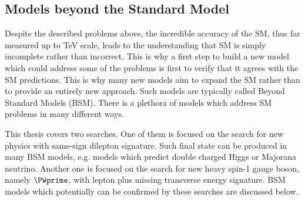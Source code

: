 
\subsection{Models beyond the Standard Model}
\label{subsec:bsm_models}
Despite the described problems above, the incredible accuracy of the SM, thus far measured up to TeV scale, leads to the understanding that SM 
is simply incomplete rather than incorrect. 
This is why a first step to build a new model which could address some of the problems is first to verify that it agrees with the SM predictions. 
This is why many new models aim to expand the SM rather than to provide an entirely new approach. Such models are typically called Beyond Standard Models (BSM).
There is a plethora of models which address SM problems in many different ways. 

This thesis covers two searches. One of them is focused on the search for new physics with same-sign dilepton signature. Such final state can be produced in many BSM models, e.g. models which predict double charged Higgs or Majorana neutrino. Another one is focused on the search for new heavy spin-1 gauge boson, namely $\PWprime$, with lepton plus missing transverse energy signature. BSM models which potentially can be confirmed by these searches are discussed below.

